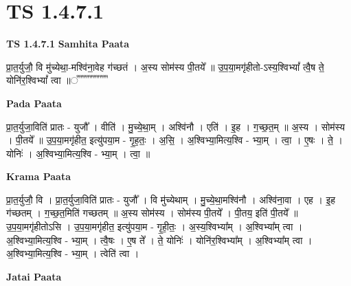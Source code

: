 \documentclass[17pt]{extarticle}
\begin{document}
\section*{ TS 1.4.7.1 }

\textbf{TS 1.4.7.1 } \newline
\textbf{Samhita Paata} \newline

प्रा॒त॒र्युजौ॒ वि मु॑च्येथा॒-मश्वि॑ना॒वेह ग॑च्छतं । अ॒स्य सोम॑स्य पी॒तये᳚ ॥ उ॒प॒या॒मगृ॑हीतो-ऽस्य॒श्विभ्यां᳚ त्वै॒ष ते॒ योनि॑र॒श्विभ्यां᳚ त्वा ॥꣡꣡꣡꣡꣡꣡꣡꣡꣡꣡꣡꣡꣡꣡꣡꣡꣡꣡ \newline

\textbf{Pada Paata} \newline

प्रा॒त॒र्युजा॒विति॑ प्रातः - युजौ᳚ । वीति॑ । मु॒च्ये॒था॒म् । अश्वि॑नौ । एति॑ । इ॒ह । ग॒च्छ॒त॒म् ॥ अ॒स्य । सोम॑स्य । पी॒तये᳚ ॥ उ॒प॒या॒मगृ॑हीत॒ इत्यु॑पया॒म - गृ॒ह॒तः॒ । अ॒सि॒ । अ॒श्विभ्या॒मित्य॒श्वि - भ्या॒म् । त्वा॒ । ए॒षः । ते॒ । योनिः॑ । अ॒श्विभ्या॒मित्य॒श्वि - भ्या॒म् । त्वा॒ ॥  \newline


\textbf{Krama Paata} \newline

प्रा॒त॒र्युजौ॒ वि । प्रा॒त॒र्युजा॒विति॑ प्रातः - युजौ᳚ । वि मु॑च्येथाम् । मु॒च्ये॒था॒मश्वि॑नौ । अश्वि॑ना॒वा । एह । इ॒ह ग॑च्छतम् । ग॒च्छ॒त॒मिति॑ गच्छतम् ॥ अ॒स्य सोम॑स्य । सोम॑स्य पी॒तये᳚ । पी॒तय॒ इति॑ पी॒तये᳚ ॥ उ॒प॒या॒मगृ॑हीतोऽसि । उ॒प॒या॒मगृ॑हीत॒ इत्यु॑पया॒म - गृ॒ही॒तः॒ । अ॒स्य॒श्विभ्या᳚म् । अ॒श्विभ्या᳚म् त्वा । अ॒श्विभ्या॒मित्य॒श्वि - भ्या॒म् । त्वै॒षः । ए॒ष ते᳚ । ते॒ योनिः॑ । योनि॑र॒श्विभ्या᳚म् । अ॒श्विभ्या᳚म् त्वा । अ॒श्विभ्या॒मित्य॒श्वि - भ्या॒म् । त्वेति॑ त्वा । \newline

\textbf{Jatai Paata} \newline
\end{document}
